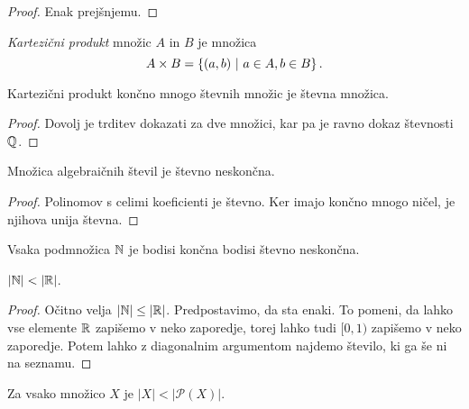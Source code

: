 \documentclass[12pt, a4paper]{article}
\begin{document}
\begin{proof}
Enak prejšnjemu.
\end{proof}

\begin{definicija}
\emph{Kartezični produkt} množic $A$ in $B$ je množica
\[
A\times B=\left\{(a,b)~\middle\vert~a\in A,b\in B\right\}.
\]
\end{definicija}

\begin{trditev}
Kartezični produkt končno mnogo števnih množic je števna množica.
\end{trditev}

\begin{proof}
Dovolj je trditev dokazati za dve množici, kar pa je ravno dokaz števnosti $\mathbb{Q}$.
\end{proof}

\begin{posledica}
Množica algebraičnih števil je števno neskončna.
\end{posledica}

\begin{proof}
Polinomov s celimi koeficienti je števno. Ker imajo končno mnogo ničel, je njihova unija števna.
\end{proof}

\begin{trditev}
Vsaka podmnožica $\mathbb{N}$ je bodisi končna bodisi števno neskončna.
\end{trditev}

\obvs

\begin{izrek}
$|\N|<|\R|$.
\end{izrek}

\begin{proof}
Očitno velja $|\mathbb{N}|\leq|\mathbb{R}|$. Predpostavimo, da sta enaki. To pomeni, da lahko vse elemente $\mathbb{R}$ zapišemo v neko zaporedje, torej lahko tudi $[0,1)$ zapišemo v neko zaporedje. Potem lahko z diagonalnim argumentom najdemo število, ki ga še ni na seznamu.
\end{proof}

\begin{izrek}
Za vsako množico $X$ je $|X|<|\mathcal{P}(X)|$.
\end{izrek}
\end{document}
